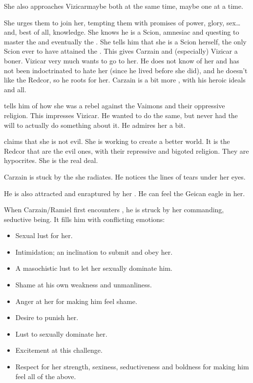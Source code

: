 She also approaches Vizicar\dash maybe both at the same time, maybe one at a time. 

She urges them to join her, tempting them with promises of power, glory, sex\ldots{} and, best of all, knowledge. 
She knows he is a Scion, amnesiac and questing to master the  and eventually the . 
She tells him that she is a Scion herself, the only Scion ever to have attained the . 
This gives Carzain and (especially) Vizicar a boner. 
Vizicar very much wants to go to her. 
He does not know of her and has not been indoctrinated to hate her (since he lived before she did), and he doesn't like the Redcor, so he roots for her. 
Carzain is a bit more \skeptical, with his heroic ideals and all. 

\Belzir{} tells him of how she was a rebel against the Vaimons and their oppressive religion. 
This impresses Vizicar. 
He wanted to do the same, but never had the will to actually do something about it. 
He admires her a bit. 

\Belzir claims that she is not evil.
She is working to create a better world. 
It is the Redcor that are the evil ones, with their repressive and bigoted religion. 
They are hypocrites.
She is the real deal. 

Carzain is stuck by the  she radiates. 
He notices the lines of tears under her eyes.

He is also attracted and enraptured by her . 
He can feel the Geican eagle in her. 

When Carzain/Ramiel first encounters \Belzir, he is struck by her commanding, seductive being. 
It fills him with conflicting emotions: 
\begin{itemize}
  \item Sexual lust for her. 
  \item Intimidation; an inclination to submit and obey her. 
  \item A masochistic lust to let her sexually dominate him. 
  \item Shame at his own weakness and unmanliness. 
  \item Anger at her for making him feel shame. 
  \item Desire to punish her. 
  \item Lust to sexually dominate her. 
  \item Excitement at this challenge. 
  \item Respect for her strength, sexiness, seductiveness and boldness for making him feel all of the above. 
\end{itemize}

